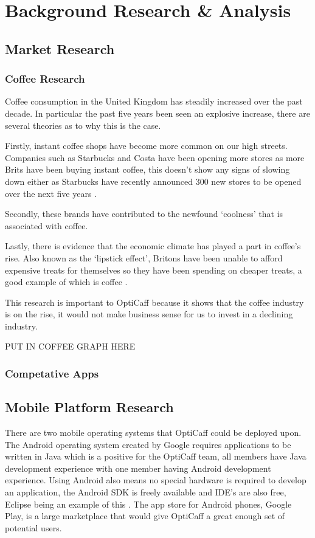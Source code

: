 \section{Background Research \& Analysis}

\subsection{Market Research}

\subsubsection{Coffee Research}
Coffee consumption in the United Kingdom has steadily increased over the past decade. In particular the past five years been seen an explosive increase, there are several theories as to why this is the case.

Firstly, instant coffee shops have become more common on our high streets. Companies such as Starbucks and Costa have been opening more stores as more Brits have been buying instant coffee, this doesn’t show any signs of slowing down either as Starbucks have recently announced 300 new stores to be opened over the next five years \cite{starbucks}.

Secondly, these brands have contributed to the newfound ‘coolness’ that is associated with coffee. 

Lastly, there is evidence that the economic climate has played a part in coffee’s rise. Also known as the ‘lipstick effect’, Britons have been unable to afford expensive treats for themselves so they have been spending on cheaper treats, a good example of which is coffee \cite{costa}.

This research is important to OptiCaff because it shows that the coffee industry is on the rise, it would not make business sense for us to invest in a declining industry.

PUT IN COFFEE GRAPH HERE 

\subsubsection{Competative Apps}

\subsection{Mobile Platform Research}
There are two mobile operating systems that OptiCaff could be deployed upon. The Android operating system created by Google requires applications to be written in Java which is a positive for the OptiCaff team, all members have Java development experience with one member having Android development experience. Using Android also means no special hardware is required to develop an application, the Android SDK is freely available and IDE’s are also free, Eclipse being an example of this \cite{Eclipse}. The app store for Android phones, Google Play, is a large marketplace that would give OptiCaff a great enough set of potential users.

